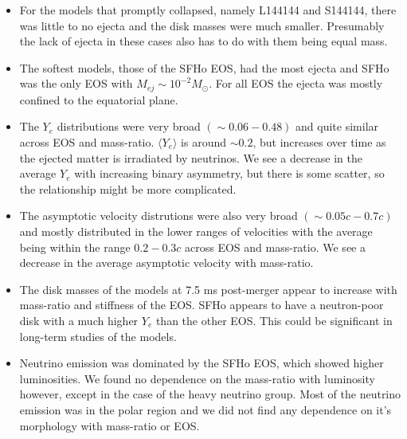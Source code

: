 \begin{itemize}
\item For the models that promptly collapsed, namely L144144 and S144144, there was little to no ejecta and the disk masses were much smaller. Presumably the lack of ejecta in these cases also has to do with them being equal mass.
\item The softest models, those of the SFHo EOS, had the most ejecta and SFHo was the only EOS with $M_{ej} \sim 10^{-2}M_\odot$. For all EOS the ejecta was mostly confined to the equatorial plane.
\item The $Y_e$ distributions were very broad $(\sim 0.06 - 0.48)$ and quite similar across EOS and mass-ratio. $\langle Y_e \rangle$ is around $\sim 0.2$, but increases over time as the ejected matter is irradiated by neutrinos. We see a decrease in the average $Y_e$ with increasing binary asymmetry, but there is some scatter, so the relationship might be more complicated.
\item The asymptotic velocity distrutions were also very broad $(\sim 0.05c - 0.7c)$ and mostly distributed in the lower ranges of velocities with the average being within the range $0.2 - 0.3c$ across EOS and mass-ratio. We see a decrease in the average asymptotic velocity with mass-ratio.
\item The disk masses of the models at 7.5 ms post-merger appear to increase with mass-ratio and stiffness of the EOS. SFHo appears to have a neutron-poor disk with a much higher $Y_e$ than the other EOS. This could be significant in long-term studies of the models.
\item Neutrino emission was dominated by the SFHo EOS, which showed higher luminosities. We found no dependence on the mass-ratio with luminosity however, except in the case of the heavy neutrino group. Most of the neutrino emission was in the polar region and we did not find any dependence on it's morphology with mass-ratio or EOS.
\end{itemize}



